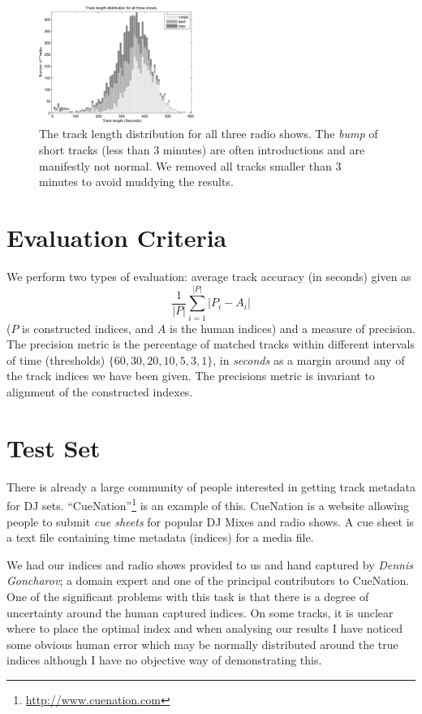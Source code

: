 \documentclass[twocolumn]{article}
\begin{document}
\begin{figure}
\centering
\includegraphics[width=0.45\textwidth]{images/tracklength.pdf}

\caption{The track length distribution for all three radio shows. The \textit{bump} of short tracks (less than $3$ minutes) are often introductions and are manifestly not normal. We removed all tracks smaller than $3$ minutes to avoid muddying the results.}
\label{fig:tracklengths}
\end{figure} 


\section{Evaluation Criteria}\label{eval_crit}

We perform two types of evaluation: average track accuracy (in seconds) given as $$\frac{1}{|P|}\sum_{i=1}^{|P|}{|P_i-A_i|}$$ ($P$ is constructed indices, and $A$ is the human indices) and a measure of precision. The precision metric is the percentage of matched tracks within different intervals of time (thresholds) $\{60, 30, 20, 10, 5, 3, 1\}$, in \emph{seconds} as a margin around any of the track indices we have been given. The precisions metric is invariant to alignment of the constructed indexes.

\section{Test Set}\label{test_set}

There is already a large community of people interested in getting track metadata for DJ sets. ``CueNation''\footnote{\url{http://www.cuenation.com}} is an example of this. CueNation is a website allowing people to submit \textit{cue sheets} for popular DJ Mixes and radio shows. A cue sheet is a text file containing time metadata (indices) for a media file.

We had our indices and radio shows provided to us and hand captured by \textit{Dennis Goncharov}; a domain expert and one of the principal contributors to CueNation. One of the significant problems with this task is that there is a degree of uncertainty around the human captured indices. On some tracks, it is unclear where to place the optimal index and when analysing our results I have noticed some obvious human error which may be normally distributed around the true indices although I have no objective way of demonstrating this. 
\end{document}
